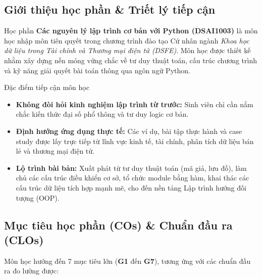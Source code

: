 \documentclass[11pt,a4paper]{article}
\begin{document}
\subsection{Giới thiệu học phần \& Triết lý tiếp cận}
Học phần \textbf{Các nguyên lý lập trình cơ bản với Python (DSAI1003)} là môn học nhập môn tiên quyết trong chương trình đào tạo Cử nhân ngành \textit{Khoa học dữ liệu trong Tài chính và Thương mại điện tử (DSFE)}. Môn học được thiết kế nhằm xây dựng nền móng vững chắc về tư duy thuật toán, cấu trúc chương trình và kỹ năng giải quyết bài toán thông qua ngôn ngữ Python.

\begin{infobox}{Đặc điểm tiếp cận môn học}
\begin{itemize}[leftmargin=1.5em, itemsep=2pt]
    \item \textbf{Không đòi hỏi kinh nghiệm lập trình từ trước:} Sinh viên chỉ cần nắm chắc kiến thức đại số phổ thông và tư duy logic cơ bản.
    \item \textbf{Định hướng ứng dụng thực tế:} Các ví dụ, bài tập thực hành và case study được lấy trực tiếp từ lĩnh vực kinh tế, tài chính, phân tích dữ liệu bán lẻ và thương mại điện tử.
    \item \textbf{Lộ trình bài bản:} Xuất phát từ tư duy thuật toán (mã giả, lưu đồ), làm chủ các cấu trúc điều khiển cơ sở, tổ chức module bằng hàm, khai thác các cấu trúc dữ liệu tích hợp mạnh mẽ, cho đến nền tảng Lập trình hướng đối tượng (OOP).
\end{itemize}
\end{infobox}

\subsection{Mục tiêu học phần (COs) \& Chuẩn đầu ra (CLOs)}
Môn học hướng đến 7 mục tiêu lớn (\textbf{G1} đến \textbf{G7}), tương ứng với các chuẩn đầu ra đo lường được:
\end{document}
